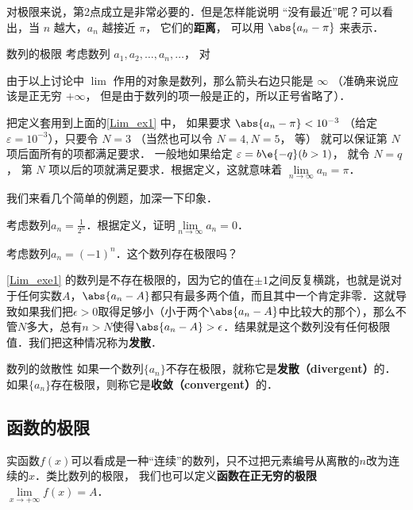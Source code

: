 对极限来说，第2点成立是非常必要的．但是怎样能说明 “没有最近”呢？可以看出，当 $n$ 越大，$a_n$ 越接近 $\pi$， 它们的\textbf{距离}， 可以用 $\abs{a_n - \pi}$ 来表示．



\begin{definition}{数列的极限}\label{Lim_def2}
考虑数列 $a_1, a_2, \dots, a_n, \dots$， 对
\end{definition}
 


由于以上讨论中 $\lim$ 作用的对象是数列，那么箭头右边只能是 $\infty$ （准确来说应该是正无穷 $+\infty$， 但是由于数列的项一般是正的，所以正号省略了）．

把定义套用到上面的\autoref{Lim_ex1} 中， 如果要求 $\abs{a_n - \pi} < 10^{-3}$ （给定 $\varepsilon  = 10^{-3}$），只要令 $N=3$ （当然也可以令 $N=4, N=5$， 等） 就可以保证第 $N$ 项后面所有的项都满足要求． 一般地如果给定 $\varepsilon  = b\e{-q}  (b > 1)$， 就令 $N = q$， 第 $N$ 项以后的项就满足要求．根据定义，这就意味着 $\lim\limits_{n \to \infty } a_n = \pi$． 

我们来看几个简单的例题，加深一下印象．

\begin{exercise}{}
考虑数列$a_n=\frac{1}{2^n}$．根据定义，证明$\lim\limits_{n\to\infty}a_n=0$．
\end{exercise}

\begin{exercise}{}\label{Lim_exe1}
考虑数列$a_n=(-1)^n$．这个数列存在极限吗？
\end{exercise}

\autoref{Lim_exe1} 的数列是不存在极限的，因为它的值在$\pm 1$之间反复横跳，也就是说对于任何实数$A$，$\abs{a_n-A}$都只有最多两个值，而且其中一个肯定非零．这就导致如果我们把$\epsilon>0$取得足够小（小于两个$\abs{a_n-A}$中比较大的那个），那么不管$N$多大，总有$n>N$使得$\abs{a_n-A}>\epsilon$．结果就是这个数列没有任何极限值．我们把这种情况称为\textbf{发散}．

\begin{definition}{数列的敛散性}\label{Lim_def4}
如果一个数列$\{a_n\}$不存在极限，就称它是\textbf{发散（divergent）}的．如果$\{a_n\}$存在极限，则称它是\textbf{收敛（convergent）}的．
\end{definition}

\subsection{函数的极限}
实函数$f(x)$可以看成是一种“连续”的数列，只不过把元素编号从离散的$n$改为连续的$x$．类比数列的极限， 我们也可以定义\textbf{函数在正无穷的极限} $\lim\limits_{x\to +\infty} f(x) = A$．

